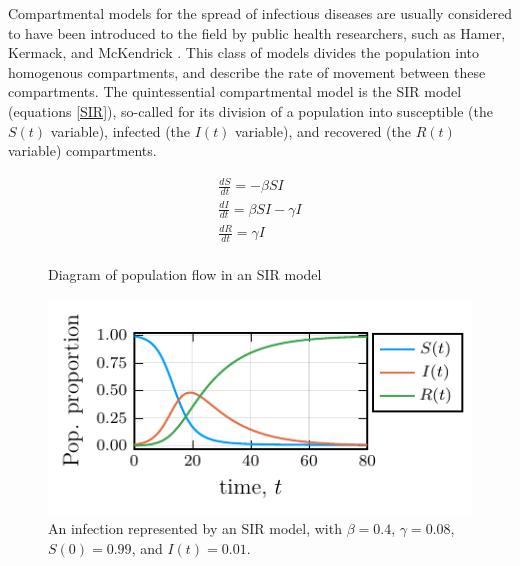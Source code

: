 Compartmental models for the spread of infectious diseases are usually considered to have been introduced to the field by public health researchers, such as Hamer, Kermack, and McKendrick \cite{hamer1906epidemic, kermack1927contribution, brauer2019mathematical,edelstein2005mathematical}. This class of models divides the population into homogenous compartments, and describe the rate of movement between these compartments. The quintessential compartmental model is the SIR model (equations \ref{SIR}), so-called for its division of a population into susceptible (the $S(t)$ variable), infected (the $I(t)$ variable), and recovered (the $R(t)$ variable) compartments. 

\begin{eqnarray}
    \frac{dS}{dt} = -\beta S I  \\
    \frac{dI}{dt} = \beta S I - \gamma I\\
    \frac{dR}{dt} = \gamma I\\
    \label{SIR}
\end{eqnarray}

\begin{figure}
    \begin{minipage}[c]{0.4\textwidth}
    \centering
        \caption{Diagram of population flow in an SIR model}
        \label{SIR_diagram}
    \end{minipage}\hfill
    \begin{minipage}[c]{0.55\textwidth}
        \centering
        \includegraphics{chapter_0/sir.pdf}
        \caption{An infection represented by an SIR model, with $\beta = 0.4$, $\gamma = 0.08$, $S(0) = 0.99$, and $I(t) = 0.01$.}
        \label{SIR_plots}
    \end{minipage}
\end{figure}


